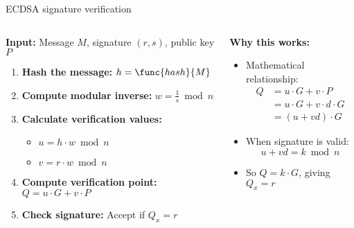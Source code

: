 \documentclass[aspectratio=169, lualatex, handout]{beamer}
\begin{document}
\begin{frame}{ECDSA signature verification}
	\begin{columns}
		\begin{column}{0.6\textwidth}
			\textbf{Input:} Message $M$, signature $(r, s)$, public key $P$
			\begin{enumerate}
				\item \textbf{Hash the message:} $h = \func{hash}{M}$
				\item \textbf{Compute modular inverse:} $w = \frac{1}{s} \bmod n$
				\item \textbf{Calculate verification values:}
				      \begin{itemize}
					      \item $u = h \cdot w \bmod n$
					      \item $v = r \cdot w \bmod n$
				      \end{itemize}
				\item \textbf{Compute verification point:} $Q = u \cdot G + v \cdot P$
				\item \textbf{Check signature:} Accept if $Q_x = r$
			\end{enumerate}
		\end{column}
		\begin{column}{0.4\textwidth}
			\textbf{Why this works:}
			\begin{itemize}
				\item Mathematical relationship:
				      \begin{align*}
					      Q & = u \cdot G + v \cdot P         \\
					        & = u \cdot G + v \cdot d \cdot G \\
					        & = (u + vd) \cdot G
				      \end{align*}
				\item When signature is valid:
				      $$u + vd = k \bmod n$$
				\item So $Q = k \cdot G$, giving $Q_x = r$
			\end{itemize}
		\end{column}
	\end{columns}
\end{frame}
\end{document}
